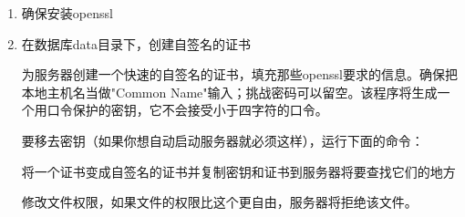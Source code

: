 \documentclass[a4,10pt,oneside,english]{sphinxmanual}
\begin{document}
\begin{enumerate}
%
\item {} 
确保安装openssl

\item {} 
在数据库data目录下，创建自签名的证书

为服务器创建一个快速的自签名的证书，填充那些openssl要求的信息。确保把本地主机名当做"Common Name"输入；挑战密码可以留空。该程序将生成一个用口令保护的密钥，它不会接受小于四字符的口令。

\begin{sphinxVerbatim}[commandchars=\\\{\}]
     
\end{sphinxVerbatim}

要移去密钥（如果你想自动启动服务器就必须这样），运行下面的命令：

\begin{sphinxVerbatim}[commandchars=\\\{\}]
     
 
\end{sphinxVerbatim}

将一个证书变成自签名的证书并复制密钥和证书到服务器将要查找它们的地方

\begin{sphinxVerbatim}[commandchars=\\\{\}]
           
\end{sphinxVerbatim}

修改文件权限，如果文件的权限比这个更自由，服务器将拒绝该文件。

\begin{sphinxVerbatim}[commandchars=\\\{\}]
  
\end{sphinxVerbatim}


\end{enumerate}
\end{document}
